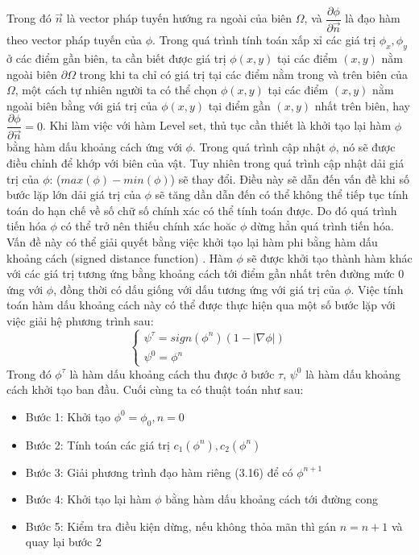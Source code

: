 \documentclass[12pt,oneside,a4]{report}
\begin{document}
Trong đó $\vec{n}$ là vector pháp tuyến hướng ra ngoài của biên $\Omega$, và $\dfrac{\partial \phi}{\partial \vec{n}} $ là đạo hàm theo vector pháp tuyến của $\phi$. Trong quá trình tính toán xấp xỉ các giá trị $\phi_x, \phi_y$ ở các điểm gần biên, ta cần biết được giá trị $\phi(x,y)$ tại các điểm $(x, y)$ nằm ngoài biên $\partial \Omega$ trong khi ta chỉ có giá trị tại các điểm nằm trong và trên biên của $\Omega$, một cách tự nhiên người ta có thể chọn $\phi(x,y)$ tại các điểm $(x, y)$ nằm ngoài biên bằng với giá trị của $\phi(x,y)$ tại điểm gần $(x,y)$  nhất trên biên, hay $\dfrac{\partial \phi}{\partial \vec{n}}=0$. Khi làm việc với hàm Level set, thủ tục cần thiết là khởi tạo lại hàm $\phi$ bằng hàm dấu khoảng cách ứng với $\phi$. Trong quá trình cập nhật $\phi$, nó sẽ được điều chỉnh để khớp với biên của vật. Tuy nhiên trong quá trình cập nhật dải giá trị của $\phi$: ($max(\phi)-min(\phi)$) sẽ thay đổi. Điều này sẽ dẫn đến vấn đề  khi số bước lặp lớn dải giá trị của $\phi$ sẽ tăng dần  dẫn đến có thể không thể tiếp tục tính toán do hạn chế về số chữ số chính xác có thể tính toán được. Do đó quá trình tiến hóa $\phi$ có thể trở nên thiếu chính xác hoăc $\phi$ dừng hẳn quá trình tiến hóa. Vấn đề này có thể giải quyết bằng việc khởi tạo lại hàm phi bằng hàm dấu khoảng cách (signed distance function) . Hàm $\phi$ sẽ được khởi tạo thành hàm khác với các giá trị tương ứng bằng khoảng cách tới điểm gần nhất trên đường mức 0 ứng với $\phi$, đồng thời có dấu giống với dấu tương ứng với giá trị của $\phi$. Việc tính toán hàm dấu khoảng cách này có thể được thực hiện qua một số bước lặp với việc giải hệ phương trình sau:
\begin{equation}
\begin{cases}
 \psi^{\tau}=sign(\phi^n)(1-|\nabla \phi|)\\
 \psi^{0}=\phi^n
   \end{cases}
\end{equation}
 Trong đó $\phi^{\tau}$ là hàm dấu khoảng cách thu được ở bước $\tau$, $\psi^{0}$ là hàm dấu khoảng cách khởi tạo ban đầu. Cuối cùng ta có thuật toán như sau:
\begin{itemize}
\item Bước 1: Khởi tạo $\phi^0=\phi_0, n=0$
\item Bước 2: Tính toán các giá trị $c_1(\phi^n), c_2(\phi^n)$
\item Bước 3: Giải phương trình đạo hàm riêng (3.16) để có $\phi^{n+1}$
\item Bước 4: Khởi tạo lại hàm $\phi$ bằng hàm dấu khoảng cách tới đường cong
\item Bước 5: Kiểm tra điều kiện dừng, nếu không thỏa mãn thì gán $n=n+1$ và quay lại bước 2
\end{itemize}
\end{document}

